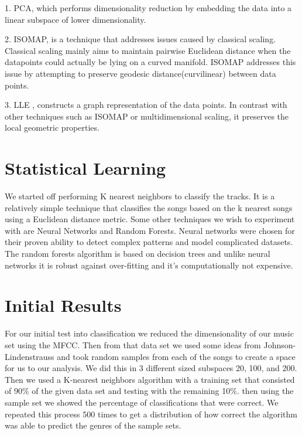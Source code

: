 \documentclass[10pt,a4paper]{article}
\begin{document}
	1.	PCA, which performs dimensionality reduction by embedding the data into a linear subspace of lower dimensionality.
	
	2.	ISOMAP, is a technique that addresses issues caused by classical scaling. Classical scaling mainly aims to maintain pairwise Euclidean distance when the datapoints could actually be lying on a curved manifold. ISOMAP addresses this issue by attempting to preserve geodesic distance(curvilinear) between data points.
	
	3.	LLE , constructs a graph representation of the data points. In contrast with other techniques such as ISOMAP or multidimensional scaling, it preserves the local geometric properties.
	
	
	
	
	\section{Statistical Learning}
	We started off performing K nearest neighbors to classify the tracks. It is a relatively simple technique that classifies the songs based on the k nearest songs using a Euclidean distance metric. Some other techniques we wish to experiment with are Neural Networks and Random Forests. Neural networks were chosen for their proven ability to detect complex patterns and model complicated datasets. The random forests algorithm is based on decision trees and unlike neural networks it is robust against over-fitting and it's computationally not expensive.
	
	\newpage
	\section{Initial Results}
	
	For our initial test into classification we reduced the dimensionality of our music set using the MFCC. Then from that data set we used some ideas from Johnson-Lindenstrauss and took random samples from each of the songs to create a space for us to our analysis. We did this in 3 different sized subspaces 20, 100, and 200. Then we used a K-nearest neighbors algorithm with a training set that consisted of 90$\%$ of the given data set and testing with the remaining 10$\%$. then using the sample set we showed the percentage of classifications that were correct. We repeated this process 500 times to get a distribution of how correct the algorithm was able to predict the genres of the sample sets. 
	
\end{document}
